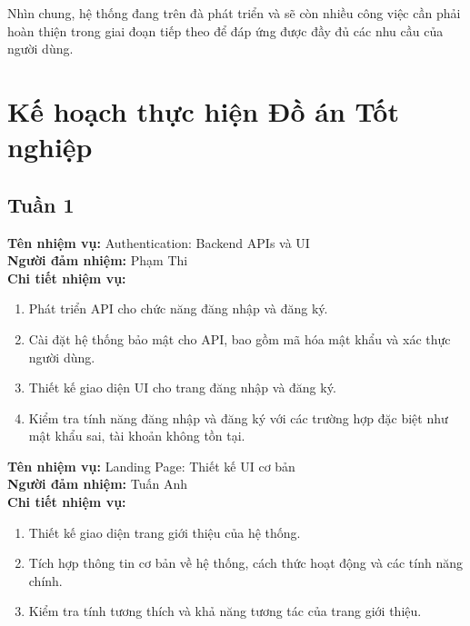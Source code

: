 Nhìn chung, hệ thống đang trên đà phát triển và sẽ còn nhiều công việc cần phải hoàn thiện trong giai đoạn tiếp theo để đáp ứng được đầy đủ các nhu cầu của người dùng.
\section{Kế hoạch thực hiện Đồ án Tốt nghiệp}
\subsection*{Tuần 1}

\noindent \textbf{Tên nhiệm vụ:} Authentication: Backend APIs và UI \\
\noindent \textbf{Người đảm nhiệm:} Phạm Thi \\
\noindent \textbf{Chi tiết nhiệm vụ:}
\begin{enumerate}[label=-]
    \item Phát triển API cho chức năng đăng nhập và đăng ký.
    \item Cài đặt hệ thống bảo mật cho API, bao gồm mã hóa mật khẩu và xác thực người dùng.
    \item Thiết kế giao diện UI cho trang đăng nhập và đăng ký.
    \item Kiểm tra tính năng đăng nhập và đăng ký với các trường hợp đặc biệt như mật khẩu sai, tài khoản không tồn tại.
\end{enumerate}

\noindent \textbf{Tên nhiệm vụ:} Landing Page: Thiết kế UI cơ bản \\
\noindent \textbf{Người đảm nhiệm:} Tuấn Anh \\
\noindent \textbf{Chi tiết nhiệm vụ:}
\begin{enumerate}[label=-]
    \item Thiết kế giao diện trang giới thiệu của hệ thống.
    \item Tích hợp thông tin cơ bản về hệ thống, cách thức hoạt động và các tính năng chính.
    \item Kiểm tra tính tương thích và khả năng tương tác của trang giới thiệu.
\end{enumerate}

